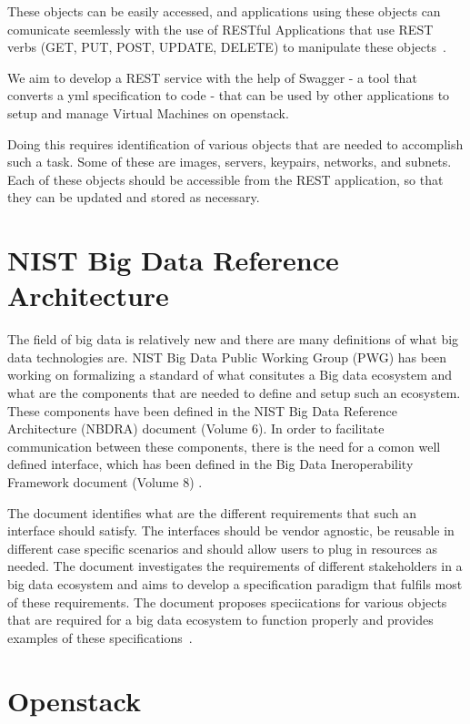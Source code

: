 These objects can be easily accessed, and applications using these
objects can comunicate seemlessly with the use of RESTful Applications
that use REST verbs (GET, PUT, POST, UPDATE, DELETE) to manipulate
these objects~\cite{hid-sp18-503-REST}.

We aim to develop a REST service with the help of Swagger - a tool
that converts a yml specification to code - that can be used by other
applications to setup and manage Virtual Machines on openstack.

Doing this requires identification of various objects that are needed
to accomplish such a task. Some of these are images, servers,
keypairs, networks, and subnets. Each of these objects should be
accessible from the REST application, so that they can be updated and
stored as necessary.

\section{NIST Big Data Reference Architecture}
The field of big data is relatively new and there are many definitions
of what big data technologies are. NIST Big Data Public Working Group
(PWG) has been working on formalizing a standard of what consitutes a
Big data ecosystem and what are the components that are needed to
define and setup such an ecosystem. These components have been defined
in the NIST Big Data Reference Architecture (NBDRA) document (Volume
6).  In order to facilitate communication between these components,
there is the need for a comon well defined interface, which has been
defined in the Big Data Ineroperability Framework document (Volume 8)
\cite{hid-sp18-503-BDRA}.

The document identifies what are the different requirements that such
an interface should satisfy. The interfaces should be vendor agnostic,
be reusable in different case specific scenarios and should allow
users to plug in resources as needed. The document investigates the
requirements of different stakeholders in a big data ecosystem and
aims to develop a specification paradigm that fulfils most of these
requirements. The document proposes speciications for various objects
that are required for a big data ecosystem to function properly and
provides examples of these specifications~\cite{hid-sp18-503-BDRA}.

\section{Openstack}

